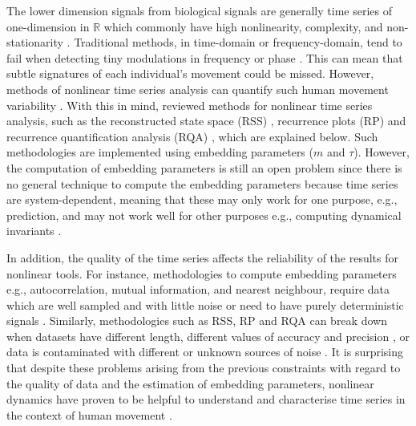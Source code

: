 The lower dimension signals from biological signals are generally time series 
of one-dimension in $\mathbb{R}$ which commonly have high nonlinearity, 
complexity, and non-stationarity 
\citep{gomezgarcia2014, huffaker2017, caballero2014}.
Traditional methods, in time-domain or frequency-domain, 
tend to fail when detecting tiny modulations in frequency or phase 
\citep{marwan2011}. This can mean that subtle signatures of each 
individual's movement could be missed. However, methods of nonlinear 
time series analysis can quantify such human movement variability 
\citep{Quintana-Duque2012, Quintana-Duque2016, sama2013, 
frank2010, gomezgarcia2014, marwan2011, stergiou2011, packard1980}.
With this in mind, \cite{bradley2015} reviewed methods for
nonlinear time series analysis, such as the reconstructed state space 
(RSS) \citep{takens1981}, recurrence plots (RP) \citep{eckmann1987} and
recurrence quantification analysis (RQA) \citep{zbilut1992}, which are 
explained below.
Such methodologies are implemented using embedding parameters ($m$ and $\tau$).
However, the computation of embedding parameters is still an open problem
since there is no general technique to compute the embedding parameters 
because time series are system-dependent, meaning that these may only work 
for one purpose, e.g., prediction, and may not work well for other purposes
e.g., computing dynamical invariants \citep{bradley2015}.

In addition, the quality of the time series affects the reliability of the 
results for nonlinear tools. For instance, methodologies to compute embedding 
parameters e.g., autocorrelation, mutual information, and nearest neighbour,
require data which are well sampled and with little noise \citep{garland2016} 
or need to have purely deterministic signals \citep{kantz2003}.
Similarly, methodologies such as RSS, RP and RQA can break down when 
datasets have different length, different values of accuracy and 
precision \citep{frank2010},
or data is contaminated with different or unknown sources of noise 
\citep{garland2016}. It is surprising that despite these problems arising 
from the previous constraints with regard to the quality of data 
and the estimation of embedding parameters, nonlinear dynamics have proven 
to be helpful to understand and characterise time series in the context 
of human movement 
\citep{Quintana-Duque2012, Quintana-Duque2016, sama2013, frank2010,
gomezgarcia2014, marwan2011, stergiou2011, bradley2015}.

